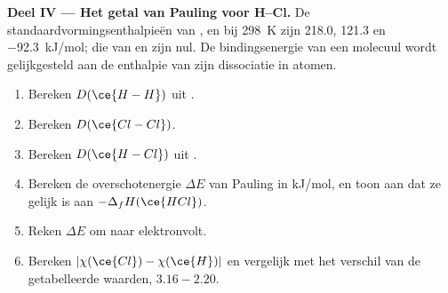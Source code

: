 \begin{problem}
\medskip
\noindent\textbf{Deel IV --- Het getal van Pauling voor H--Cl.}
De standaardvormingsenthalpieën van ,  en
 bij \qty{298}{K} zijn 218.0, 121.3 en \qty{-92.3}{kJ/mol};
die van  en  zijn nul. De bindingsenergie van een
molecuul wordt gelijkgesteld aan de enthalpie van zijn dissociatie in
atomen.
\begin{enumerate}[resume]
  \item Bereken $D(\ce{H-H})$ uit .
  \item Bereken $D(\ce{Cl-Cl})$.
  \item Bereken $D(\ce{H-Cl})$ uit .
  \item Bereken de overschotenergie $\Delta E$ van Pauling in kJ/mol, en
        toon aan dat ze gelijk is aan $-\Delta_f H(\ce{HCl})$.
  \item Reken $\Delta E$ om naar elektronvolt.
  \item Bereken $|\chi(\ce{Cl}) - \chi(\ce{H})|$ en vergelijk met het
        verschil van de getabelleerde waarden, $3.16 - 2.20$.
\end{enumerate}
\end{problem}
